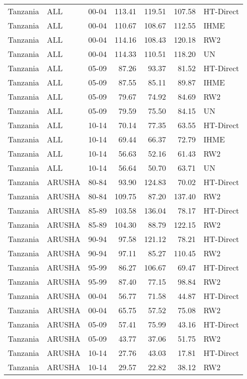 \begin{longtable}{lllrrrl}
  Tanzania & ALL & 00-04 & 113.41 & 119.51 & 107.58 & HT-Direct \\ 
  Tanzania & ALL & 00-04 & 110.67 & 108.67 & 112.55 & IHME \\ 
  Tanzania & ALL & 00-04 & 114.16 & 108.43 & 120.18 & RW2 \\ 
  Tanzania & ALL & 00-04 & 114.33 & 110.51 & 118.20 & UN \\ 
  Tanzania & ALL & 05-09 & 87.26 & 93.37 & 81.52 & HT-Direct \\ 
  Tanzania & ALL & 05-09 & 87.55 & 85.11 & 89.87 & IHME \\ 
  Tanzania & ALL & 05-09 & 79.67 & 74.92 & 84.69 & RW2 \\ 
  Tanzania & ALL & 05-09 & 79.59 & 75.50 & 84.15 & UN \\ 
  Tanzania & ALL & 10-14 & 70.14 & 77.35 & 63.55 & HT-Direct \\ 
  Tanzania & ALL & 10-14 & 69.44 & 66.37 & 72.79 & IHME \\ 
  Tanzania & ALL & 10-14 & 56.63 & 52.16 & 61.43 & RW2 \\ 
  Tanzania & ALL & 10-14 & 56.64 & 50.70 & 63.71 & UN \\ 
  Tanzania & ARUSHA & 80-84 & 93.90 & 124.83 & 70.02 & HT-Direct \\ 
  Tanzania & ARUSHA & 80-84 & 109.75 & 87.20 & 137.40 & RW2 \\ 
  Tanzania & ARUSHA & 85-89 & 103.58 & 136.04 & 78.17 & HT-Direct \\ 
  Tanzania & ARUSHA & 85-89 & 104.30 & 88.79 & 122.15 & RW2 \\ 
  Tanzania & ARUSHA & 90-94 & 97.58 & 121.12 & 78.21 & HT-Direct \\ 
  Tanzania & ARUSHA & 90-94 & 97.11 & 85.27 & 110.45 & RW2 \\ 
  Tanzania & ARUSHA & 95-99 & 86.27 & 106.67 & 69.47 & HT-Direct \\ 
  Tanzania & ARUSHA & 95-99 & 87.40 & 77.15 & 98.84 & RW2 \\ 
  Tanzania & ARUSHA & 00-04 & 56.77 & 71.58 & 44.87 & HT-Direct \\ 
  Tanzania & ARUSHA & 00-04 & 65.75 & 57.52 & 75.08 & RW2 \\ 
  Tanzania & ARUSHA & 05-09 & 57.41 & 75.99 & 43.16 & HT-Direct \\ 
  Tanzania & ARUSHA & 05-09 & 43.77 & 37.06 & 51.75 & RW2 \\ 
  Tanzania & ARUSHA & 10-14 & 27.76 & 43.03 & 17.81 & HT-Direct \\ 
  Tanzania & ARUSHA & 10-14 & 29.57 & 22.82 & 38.12 & RW2 \\ 

\end{longtable}
